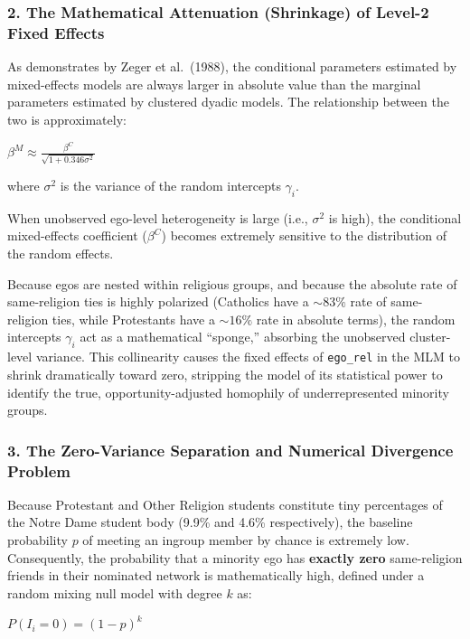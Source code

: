 \documentclass[
  letterpaper,
  DIV=11,
  numbers=noendperiod]{scrartcl}
\begin{document}
\subsubsection{2. The Mathematical Attenuation (Shrinkage) of Level-2
Fixed
Effects}\label{the-mathematical-attenuation-shrinkage-of-level-2-fixed-effects}

As demonstrates by Zeger et al.~(1988), the conditional parameters
estimated by mixed-effects models are always larger in absolute value
than the marginal parameters estimated by clustered dyadic models. The
relationship between the two is approximately:

\(\beta^M \approx \frac{\beta^C}{\sqrt{1 + 0.346 \sigma^2}}\)

where \(\sigma^2\) is the variance of the random intercepts
\(\gamma_i\).

When unobserved ego-level heterogeneity is large (i.e., \(\sigma^2\) is
high), the conditional mixed-effects coefficient (\(\beta^C\)) becomes
extremely sensitive to the distribution of the random effects.

Because egos are nested within religious groups, and because the
absolute rate of same-religion ties is highly polarized (Catholics have
a \(\sim 83\%\) rate of same-religion ties, while Protestants have a
\(\sim 16\%\) rate in absolute terms), the random intercepts
\(\gamma_i\) act as a mathematical ``sponge,'' absorbing the unobserved
cluster-level variance. This collinearity causes the fixed effects of
\texttt{ego\_rel} in the MLM to shrink dramatically toward zero,
stripping the model of its statistical power to identify the true,
opportunity-adjusted homophily of underrepresented minority groups.

\subsubsection{3. The Zero-Variance Separation and Numerical Divergence
Problem}\label{the-zero-variance-separation-and-numerical-divergence-problem}

Because Protestant and Other Religion students constitute tiny
percentages of the Notre Dame student body (9.9\% and 4.6\%
respectively), the baseline probability \(p\) of meeting an ingroup
member by chance is extremely low. Consequently, the probability that a
minority ego has \textbf{exactly zero} same-religion friends in their
nominated network is mathematically high, defined under a random mixing
null model with degree \(k\) as:

\(P(I_i = 0) = (1 - p)^k\)
\end{document}
